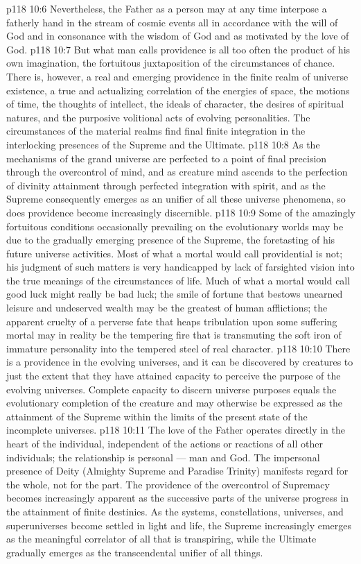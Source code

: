 \vs p118 10:6 Nevertheless, the Father as a person may at any time interpose a fatherly hand in the stream of cosmic events all in accordance with the will of God and in consonance with the wisdom of God and as motivated by the love of God.
\vs p118 10:7 But what man calls providence is all too often the product of his own imagination, the fortuitous juxtaposition of the circumstances of chance. There is, however, a real and emerging providence in the finite realm of universe existence, a true and actualizing correlation of the energies of space, the motions of time, the thoughts of intellect, the ideals of character, the desires of spiritual natures, and the purposive volitional acts of evolving personalities. The circumstances of the material realms find final finite integration in the interlocking presences of the Supreme and the Ultimate.
\vs p118 10:8 As the mechanisms of the grand universe are perfected to a point of final precision through the overcontrol of mind, and as creature mind ascends to the perfection of divinity attainment through perfected integration with spirit, and as the Supreme consequently emerges as an  unifier of all these universe phenomena, so does providence become increasingly discernible.
\vs p118 10:9 Some of the amazingly fortuitous conditions occasionally prevailing on the evolutionary worlds may be due to the gradually emerging presence of the Supreme, the foretasting of his future universe activities. Most of what a mortal would call providential is not; his judgment of such matters is very handicapped by lack of farsighted vision into the true meanings of the circumstances of life. Much of what a mortal would call good luck might really be bad luck; the smile of fortune that bestows unearned leisure and undeserved wealth may be the greatest of human afflictions; the apparent cruelty of a perverse fate that heaps tribulation upon some suffering mortal may in reality be the tempering fire that is transmuting the soft iron of immature personality into the tempered steel of real character.
\vs p118 10:10 There is a providence in the evolving universes, and it can be discovered by creatures to just the extent that they have attained capacity to perceive the purpose of the evolving universes. Complete capacity to discern universe purposes equals the evolutionary completion of the creature and may otherwise be expressed as the attainment of the Supreme within the limits of the present state of the incomplete universes.
\vs p118 10:11 The love of the Father operates directly in the heart of the individual, independent of the actions or reactions of all other individuals; the relationship is personal --- man and God. The impersonal presence of Deity (Almighty Supreme and Paradise Trinity) manifests regard for the whole, not for the part. The providence of the overcontrol of Supremacy becomes increasingly apparent as the successive parts of the universe progress in the attainment of finite destinies. As the systems, constellations, universes, and superuniverses become settled in light and life, the Supreme increasingly emerges as the meaningful correlator of all that is transpiring, while the Ultimate gradually emerges as the transcendental unifier of all things.
